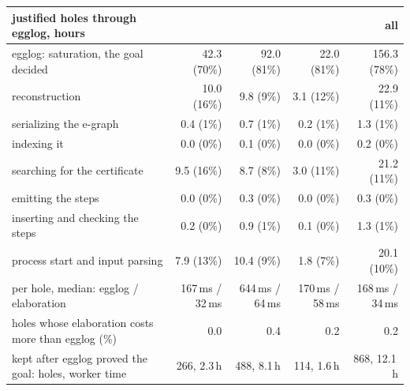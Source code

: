 \begin{tabular}{lrrrr}
\toprule
justified holes through egglog, hours & \UF{} & \LIA{} & \LRA{} & all \\
\midrule
egglog: saturation, the goal decided & 42.3 (70\%) & 92.0 (81\%) & 22.0 (81\%) & 156.3 (78\%) \\
reconstruction & 10.0 (16\%) & 9.8 (9\%) & 3.1 (12\%) & 22.9 (11\%) \\
\quad serializing the e-graph & 0.4 (1\%) & 0.7 (1\%) & 0.2 (1\%) & 1.3 (1\%) \\
\quad indexing it & 0.0 (0\%) & 0.1 (0\%) & 0.0 (0\%) & 0.2 (0\%) \\
\quad searching for the certificate & 9.5 (16\%) & 8.7 (8\%) & 3.0 (11\%) & 21.2 (11\%) \\
\quad emitting the steps & 0.0 (0\%) & 0.3 (0\%) & 0.0 (0\%) & 0.3 (0\%) \\
inserting and checking the steps & 0.2 (0\%) & 0.9 (1\%) & 0.1 (0\%) & 1.3 (1\%) \\
process start and input parsing & 7.9 (13\%) & 10.4 (9\%) & 1.8 (7\%) & 20.1 (10\%) \\
\midrule
per hole, median: egglog / elaboration & 167\,ms / 32\,ms & 644\,ms / 64\,ms & 170\,ms / 58\,ms & 168\,ms / 34\,ms \\
holes whose elaboration costs more than egglog (\%) & 0.0 & 0.4 & 0.2 & 0.2 \\
\midrule
kept after egglog proved the goal: holes, worker time & 266, 2.3\,h & 488, 8.1\,h & 114, 1.6\,h & 868, 12.1\,h \\
\bottomrule
\end{tabular}
